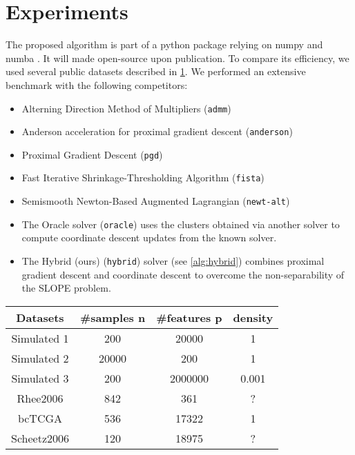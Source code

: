 \section{Experiments}\label{sec:experiments}

The proposed algorithm is part of a python package relying on numpy and numba \cite{harris2020,lam2015}.
It will made open-source upon publication. To compare its efficiency, we used several public datasets described in \cref{table:datasets}.
We performed an extensive benchmark with the following competitors:
\begin{itemize}[noitemsep]
    \item Alterning Direction Method of Multipliers (\texttt{admm}) \cite{boyd2010}
    \item Anderson acceleration for proximal gradient descent (\texttt{anderson}) \cite{zhang2020}
    \item Proximal Gradient Descent (\texttt{pgd}) \cite{combettes2005}
    \item Fast Iterative Shrinkage-Thresholding Algorithm (\texttt{fista}) \cite{beck2009}
    \item Semismooth Newton-Based Augmented Lagrangian (\texttt{newt-alt}) \cite{Ziyan2019}
    \item The Oracle solver (\texttt{oracle}) uses the clusters obtained via another
     solver to compute coordinate descent updates from the known solver.
    \item The Hybrid (ours) (\texttt{hybrid}) solver (see \cref{alg:hybrid}) combines proximal gradient descent
     and coordinate descent to overcome the non-separability of the SLOPE problem.
\end{itemize}

\begin{table}[]
    \centering
    \label{table:datasets}
    \begin{tabular}{cccc}
    \hline
    Datasets    & \#samples n & \#features p & density \\ \hline
    Simulated 1 & 200 & \num{20000} & 1 \\
    Simulated 2 & \num{20000} & \num{200} & 1 \\
    Simulated 3 & 200 & \num{2000000} & 0.001 \\ 
    Rhee2006    & 842         & 361          & ?       \\ 
    bcTCGA      & 536         & \num{17322}        & 1       \\
    Scheetz2006 & 120         & \num{18975}        & ?       \\ \hline
    \end{tabular}
\end{table}


